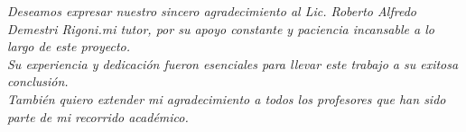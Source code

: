 \thispagestyle{empty}
\null\vfill


\thispagestyle{empty}
\null\vfill

{\large \textit{ Deseamos expresar nuestro sincero agradecimiento al Lic. Roberto Alfredo Demestri Rigoni.mi tutor, por su apoyo constante y paciencia incansable a lo largo de este proyecto. \\ Su experiencia y dedicación fueron esenciales para llevar este trabajo a su exitosa conclusión.\\ También quiero extender mi agradecimiento a todos los profesores que han sido parte de mi recorrido académico.}}


